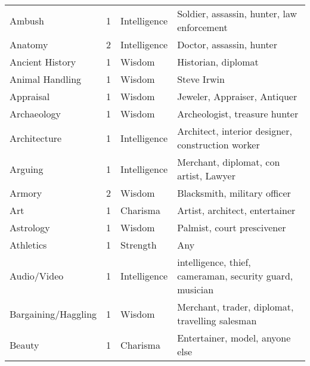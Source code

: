 \documentclass[twoside]{book}
\begin{document}
\begin{longtable}{p{1.25in}llp{12em}}
  \raggedright
           Ambush 
  &
   1 
  &
   Intelligence 
  &
   Soldier, assassin,
           hunter, law enforcement 
  \tabularnewline
      
  \raggedright
           Anatomy 
  &
   2 
  &
   Intelligence 
  &
   Doctor, assassin, hunter
           
  \tabularnewline
      
  \raggedright
           Ancient History 
  &
   1 
  &
   Wisdom 
  &
   Historian, diplomat
           
  \tabularnewline
      
  \raggedright
           Animal Handling 
  &
   1 
  &
   Wisdom 
  &
   Steve Irwin 
  \tabularnewline
      
  \raggedright
           Appraisal 
  &
   1 
  &
   Wisdom 
  &
   Jeweler, Appraiser,
           Antiquer 
  \tabularnewline
      
  \raggedright
           Archaeology 
  &
   1 
  &
   Wisdom 
  &
   Archeologist, treasure
           hunter 
  \tabularnewline
      
  \raggedright
           Architecture 
  &
   1 
  &
   Intelligence 
  &
   Architect, interior
           designer, construction worker 
  \tabularnewline
      
  \raggedright
           Arguing 
  &
   1 
  &
   Intelligence 
  &
   Merchant, diplomat, con
           artist, Lawyer 
  \tabularnewline
      
  \raggedright
           Armory 
  &
   2 
  &
   Wisdom 
  &
   Blacksmith, military
           officer 
  \tabularnewline
      
  \raggedright
           Art 
  &
   1 
  &
   Charisma 
  &
   Artist, architect,
           entertainer 
  \tabularnewline
      
  \raggedright
           Astrology 
  &
   1 
  &
   Wisdom 
  &
   Palmist, court
           prescivener 
  \tabularnewline
      
  \raggedright
           Athletics 
  &
   1 
  &
   Strength 
  &
   Any 
  \tabularnewline
      
  \raggedright
           Audio/Video 
  &
   1 
  &
   Intelligence 
  &
   intelligence, thief,
           cameraman, security guard, musician 
  \tabularnewline
      
  \raggedright
           Bargaining/Haggling 
  &
   1 
  &
   Wisdom 
  &
   Merchant, trader,
           diplomat, travelling salesman 
  \tabularnewline
      
  \raggedright
           Beauty 
  &
   1 
  &
   Charisma 
  &
   Entertainer, model,
           anyone else 
  \tabularnewline
      

\end{longtable}
\end{document}

